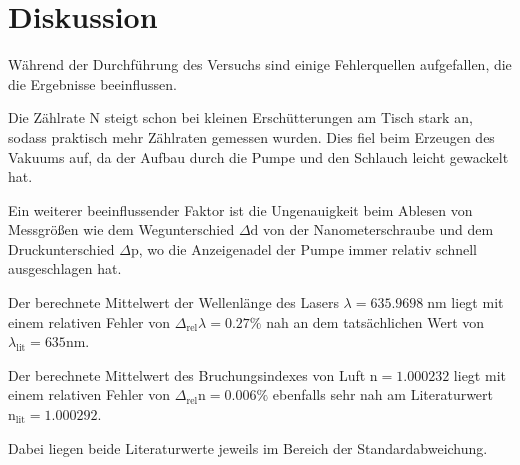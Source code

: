 \section{Diskussion}
\label{sec:Diskussion}
Während der Durchführung des Versuchs sind einige Fehlerquellen aufgefallen, die die Ergebnisse beeinflussen.

\noindent
Die Zählrate N steigt schon bei kleinen Erschütterungen am Tisch stark an, sodass praktisch mehr Zählraten gemessen wurden.
Dies fiel beim Erzeugen des Vakuums auf, da der Aufbau durch die Pumpe und den Schlauch leicht gewackelt hat.

\noindent
Ein weiterer beeinflussender Faktor ist die Ungenauigkeit beim Ablesen von Messgrößen wie dem Wegunterschied $\Delta \text{d}$ von der Nanometerschraube 
und dem Druckunterschied $\Delta \text{p}$, wo die Anzeigenadel der Pumpe immer relativ schnell ausgeschlagen hat.

\noindent
Der berechnete Mittelwert der Wellenlänge des Lasers $\lambda = 635.9698 \; \si{\nano\meter}$ liegt mit einem relativen Fehler von  $\Delta_\text{rel}\lambda = 0.27\%$ nah an dem tatsächlichen Wert von $\lambda_\text{lit} = 635 \si{\nano\meter}$.


\noindent
Der berechnete Mittelwert des Bruchungsindexes von Luft $\text{n} = 1.000232$ liegt mit einem relativen Fehler von $\Delta_\text{rel} \text{n} = 0.006\%$ ebenfalls sehr nah am Literaturwert $\text{n}_\text{lit} = 1.000292$.

\noindent
Dabei liegen beide Literaturwerte jeweils im Bereich der Standardabweichung.



